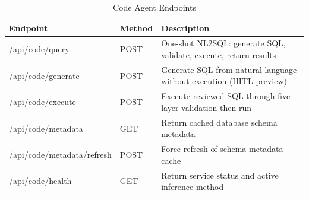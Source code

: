 \begin{table}[H]
\small\singlespacing
\centering
\caption{Code Agent Endpoints}
\label{tab:api-code}
\begin{tabularx}{\textwidth}{>{\RaggedRight\arraybackslash}p{}>{\RaggedRight\arraybackslash}p{1.3cm}>{\RaggedRight\arraybackslash}X}
\toprule
\textbf{Endpoint} & \textbf{Method} & \textbf{Description} \\
\midrule
/api/code/query & POST & One-shot NL2SQL: generate SQL, validate, execute, return results \\
/api/code/generate & POST & Generate SQL from natural language without execution (HITL preview) \\
/api/code/execute & POST & Execute reviewed SQL through five-layer validation then run \\
/api/code/metadata & GET & Return cached database schema metadata \\
/api/code/metadata/refresh & POST & Force refresh of schema metadata cache \\
/api/code/health & GET & Return service status and active inference method \\
\bottomrule
\end{tabularx}
\end{table}


